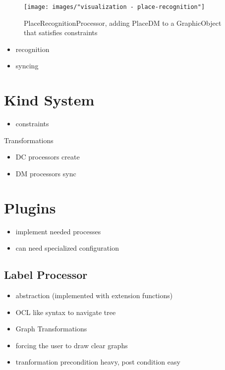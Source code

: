 \begin{figure}
  \centering
  \texttt{[image: images/"visualization - place-recognition"]}
  \caption{PlaceRecognitionProcessor, adding PlaceDM to a GraphicObject that satisfies constraints}
  \label{fig:place-recognition}
\end{figure}




\begin{itemize}
  \item recognition
  \item syncing
\end{itemize}





\section{Kind System}
\begin{itemize}
  \item constraints
\end{itemize}

Transformations

\begin{itemize}
  \item DC processors create
  \item DM processors sync
\end{itemize}

\section{Plugins}
\begin{itemize}
  \item implement needed processes
  \item can need specialized configuration
\end{itemize}
\subsection{Label Processor}







   


\begin{itemize}
  \item abstraction (implemented with extension functions)
  \item OCL like syntax to navigate tree
  \item Graph Transformations 
  \item forcing the user to draw clear graphs
  \item tranformation precondition heavy, post condition easy
\end{itemize}
